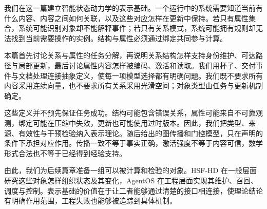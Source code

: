 \label{part:static_metatheory}

我们在这一篇建立智能状态动力学的表示基础。一个运行中的系统需要知道当前有什么内容、内容之间如何关联，以及这些对应怎样在更新中保持。若只有属性集合，系统可能识别对象却不能解释事件；若只有关系模式，系统可能拥有规则却无法找到当前需要操作的实例。结构与属性必须通过绑定共同参与计算。

本篇首先讨论关系与属性的任务分解，再说明关系结构怎样支持身份维护、可达路径与局部更新，最后讨论属性内容怎样被编码、激活和读取。我们用杯子、交付事件与文档处理连接抽象定义，使每一项模型选择都有明确问题。我们既不要求所有内容采用连续向量，也不要求所有关系采用光滑空间；对象类型由任务与更新机制确定。

这些定义并不预先保证任务成功。结构可能包含错误关系，属性可能来自不可靠观测，绑定可能在压缩中失效，更新也可能使用过时版本。因此，我们把类型、来源、有效性与干预检验纳入表示理论。随后给出的图传播和门控模型，只在声明的条件下承担对应作用。传播一致不等于事实正确，激活强度不等于内容可信，数学形式合法也不等于已经得到经验支持。

由此，我们为后续篇章准备一组可以被计算和检验的对象。HSF-HD 在一般层面研究这些对象怎样组织状态及其变化，AgentOS 在工程层面实现其维护、召回、调度与控制。表示基础的价值在于让二者能够通过清楚的接口相连接，使理论结论有明确作用范围，工程失败也能够被追踪到具体机制。
